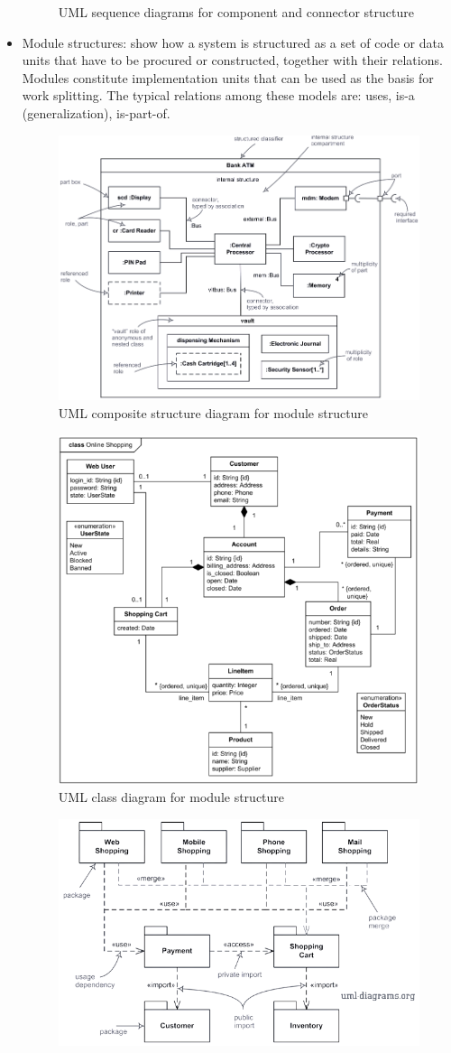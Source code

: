 \documentclass[12pt, a4paper]{report}
\begin{document}
\begin{itemize}
\begin{figure}[H]
                        \caption{UML sequence diagrams for component and connector structure}
                    \end{figure}
                \item Module structures: show how a system is structured as a set of code or data units that have to be procured or constructed, together with their relations. Modules 
                    constitute implementation units that can be used as the basis for work splitting. The typical relations among these models are: uses, is-a (generalization), is-part-of.
                    \begin{figure}[H]
                        \centering
                        \includegraphics[width=0.5\linewidth]{images/modular1.png}
                        \caption{UML composite structure diagram for module structure}
                    \end{figure}
                    \begin{figure}[H]
                        \centering
                        \includegraphics[width=0.5\linewidth]{images/modular2.png}
                        \caption{UML class diagram for module structure}
                    \end{figure}
                    \begin{figure}[H]
                        \centering
                        \includegraphics[width=0.5\linewidth]{images/modular3.png}

\end{figure}
\end{itemize}
\end{document}
